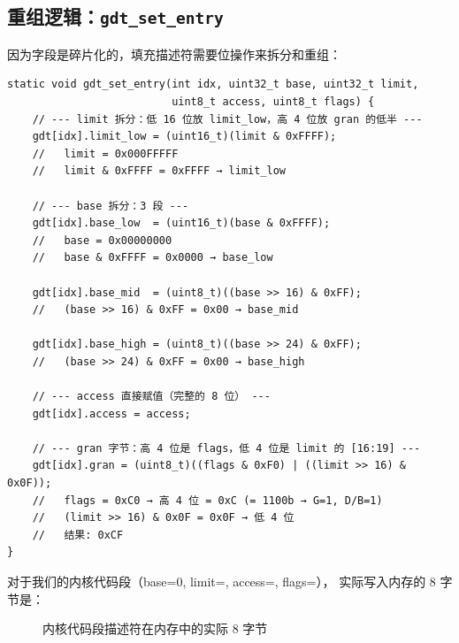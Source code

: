 \subsection{重组逻辑：\texttt{gdt\_set\_entry}}

因为字段是碎片化的，填充描述符需要位操作来拆分和重组：

\begin{lstlisting}[style=cstyle]
static void gdt_set_entry(int idx, uint32_t base, uint32_t limit,
                          uint8_t access, uint8_t flags) {
    // --- limit 拆分：低 16 位放 limit_low，高 4 位放 gran 的低半 ---
    gdt[idx].limit_low = (uint16_t)(limit & 0xFFFF);
    //   limit = 0x000FFFFF
    //   limit & 0xFFFF = 0xFFFF → limit_low

    // --- base 拆分：3 段 ---
    gdt[idx].base_low  = (uint16_t)(base & 0xFFFF);
    //   base = 0x00000000
    //   base & 0xFFFF = 0x0000 → base_low

    gdt[idx].base_mid  = (uint8_t)((base >> 16) & 0xFF);
    //   (base >> 16) & 0xFF = 0x00 → base_mid

    gdt[idx].base_high = (uint8_t)((base >> 24) & 0xFF);
    //   (base >> 24) & 0xFF = 0x00 → base_high

    // --- access 直接赋值（完整的 8 位） ---
    gdt[idx].access = access;

    // --- gran 字节：高 4 位是 flags，低 4 位是 limit 的 [16:19] ---
    gdt[idx].gran = (uint8_t)((flags & 0xF0) | ((limit >> 16) & 0x0F));
    //   flags = 0xC0 → 高 4 位 = 0xC (= 1100b → G=1, D/B=1)
    //   (limit >> 16) & 0x0F = 0x0F → 低 4 位
    //   结果: 0xCF
}
\end{lstlisting}

对于我们的内核代码段（base=0, limit=, access=, flags=），
实际写入内存的 8 字节是：

\begin{figure}[H]
  \centering
  
  \caption{内核代码段描述符在内存中的实际 8 字节}
\end{figure}


